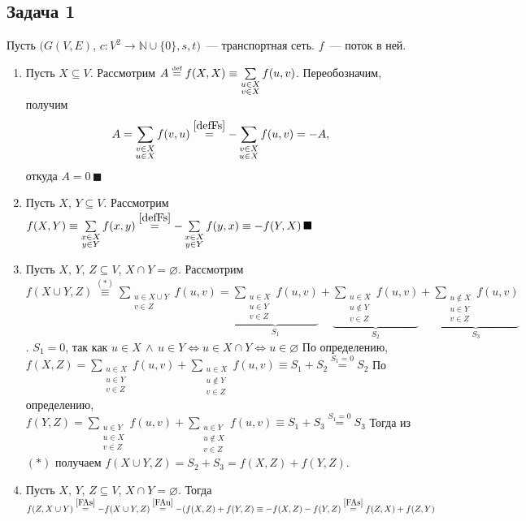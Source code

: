 \documentclass[a4paper]{article}
\def\eqdef{\overset{\mbox{\tiny def}}{=}}
\newcommand{\Nz}{\mathbb{N}\cup\{0\}}
\begin{document}
\subsection*{Задача 1}
Пусть $(G(V,E)$, $c\colon V^2\to\Nz, s, t)$~--- транспортная сеть. $f$~--- поток в ней.
\begin{enumerate}
\item \label{FAXX} Пусть $X\subseteq V$. Рассмотрим $A\eqdef f(X,X)\equiv \sum\limits_{\substack{u\in X\\v\in X}}f(u,v)$. Переобозначим, получим $$A=\sum\limits_{\substack{v\in X\\u\in X}}f(v,u)\overset{\ref{defFs}}{=}-\sum\limits_{\substack{v\in X\\u\in X}}f(u,v)=-A,$$
откуда $A=0\,\blacksquare$
\item \label{FAs} Пусть $X,\,Y\subseteq V$. Рассмотрим $f(X, Y)\equiv\sum\limits_{\substack{x\in X\\y\in Y}}f(x,y)\overset{\ref{defFs}}{=}-\sum\limits_{\substack{x\in X\\y\in Y}}f(y,x)\equiv -f(Y,X)\,\blacksquare$
\item \label{FAu} Пусть $X,\,Y,\,Z\subseteq V$, $X\cap Y=\varnothing$. Рассмотрим $f(X\cup Y, Z)\overset{(*)}{\equiv}\sum\limits_{\substack{u\in X\cup Y\\ v\in Z}}f(u,v)=
\underbrace{\sum\limits_{\substack{u\in X\\u\in Y\\ v\in Z}}f(u,v)}_{S_1}+
\underbrace{\sum\limits_{\substack{u\in X\\u\notin Y\\ v\in Z}}f(u,v)}_{S_2}+
\underbrace{\sum\limits_{\substack{u\notin X\\u\in Y\\ v\in Z}}f(u,v)}_{S_3}$.\newline
$S_1=0$, так как $u\in X\,\wedge\,u\in Y\Leftrightarrow u\in X\cap Y\Leftrightarrow u\in\varnothing$\newline
По определению, $f(X,Z)=\sum\limits_{\substack{u\in X\\u\in Y\\v\in Z}}f(u,v)+\sum\limits_{\substack{u\in X\\u\notin Y\\v\in Z}}f(u,v)\equiv S_1+S_2\overset{S_1=0}{=}S_2$\newline
По определению, $f(Y,Z)=\sum\limits_{\substack{u\in Y\\u\in X\\v\in Z}}f(u,v)+\sum\limits_{\substack{u\in Y\\u\notin X\\v\in Z}}f(u,v)\equiv S_1+S_3\overset{S_1=0}{=}S_3$\newline
Тогда из $(*)$ получаем $f(X\cup Y,Z)=S_2+S_3=f(X,Z)+f(Y,Z)$.
\item Пусть $X,\,Y,\,Z\subseteq V$, $X\cap Y=\varnothing$. Тогда $f(Z,X\cup Y)\overset{\ref{FAs}}{=}-f(X\cup Y,Z)\overset{\ref{FAu}}{=}-(f(X,Z)+f(Y,Z)\equiv -f(X,Z)-f(Y,Z)\overset{\ref{FAs}}{=}f(Z,X)+f(Z,Y)$
\end{enumerate}
\end{document}
